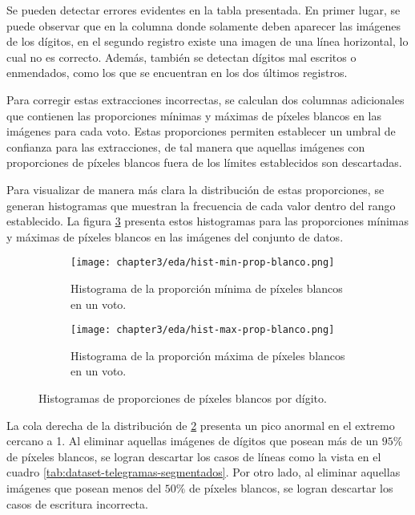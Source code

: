 Se pueden detectar errores evidentes en la tabla presentada. En primer lugar, se puede observar que en la columna donde
solamente deben aparecer las imágenes de los dígitos, en el segundo registro existe una imagen de una línea horizontal,
lo cual no es correcto. Además, también se detectan dígitos mal escritos o enmendados, como los que se encuentran en
los dos últimos registros.

Para corregir estas extracciones incorrectas, se calculan dos columnas adicionales que contienen las proporciones
mínimas y máximas de píxeles blancos en las imágenes para cada voto. Estas proporciones permiten establecer un umbral
de confianza para las extracciones, de tal manera que aquellas imágenes con proporciones de píxeles blancos fuera de
los límites establecidos son descartadas.

Para visualizar de manera más clara la distribución de estas proporciones, se generan histogramas que muestran la
frecuencia de cada valor dentro del rango establecido. La figura \ref{fig:histogramas-min-max-prop-blanco} presenta
estos histogramas para las proporciones mínimas y máximas de píxeles blancos en las imágenes del conjunto de datos.

\begin{figure}[H]
    \centering
    \begin{subfigure}[h]{0.48\textwidth}
        \texttt{[image: chapter3/eda/hist-min-prop-blanco.png]}
        \caption{Histograma de la proporción mínima de píxeles blancos en un voto.}
        \label{fig:histograma-min-prop-blanco}
    \end{subfigure}
    \hfill
    \begin{subfigure}[h]{0.48\textwidth}
        \texttt{[image: chapter3/eda/hist-max-prop-blanco.png]}
        \caption{Histograma de la proporción máxima de píxeles blancos en un voto.}
        \label{fig:histograma-max-prop-blanco}
    \end{subfigure}
    \caption[Histogramas de proporciones mínimas y máximas de píxeles blancos por dígito]{Histogramas de proporciones de píxeles blancos por dígito.}
    \label{fig:histogramas-min-max-prop-blanco}
\end{figure}

La cola derecha de la distribución de \ref{fig:histograma-max-prop-blanco} presenta un pico anormal en el extremo
cercano a 1. Al eliminar aquellas imágenes de dígitos que posean más de un $95\%$ de píxeles blancos, se logran
descartar los casos de líneas como la vista en el cuadro \ref{tab:dataset-telegramas-segmentados}. Por otro lado, al
eliminar aquellas imágenes que posean menos del $50\%$ de píxeles blancos, se logran descartar los casos de escritura
incorrecta.

